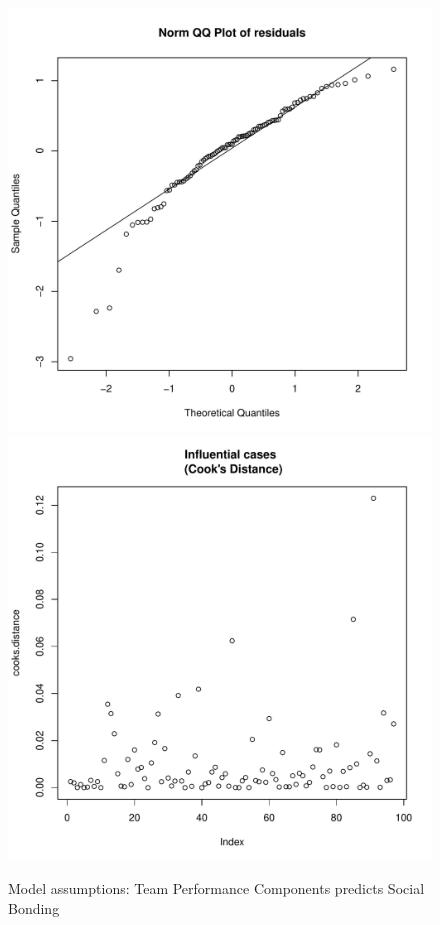 \begin{CJK}{UTF8}{gbsn}
\begin{figure}[htbp]
        \includegraphics[scale =.4]{images/MLM3bQQNorm.pdf}
        \includegraphics[scale =.4]{images/MLM3bCooksD.pdf}
        \caption{Model assumptions: Team Performance Components predicts Social Bonding }
        \label{fig:MLM3bAssumptions}
     \end{figure}


\end{CJK}
